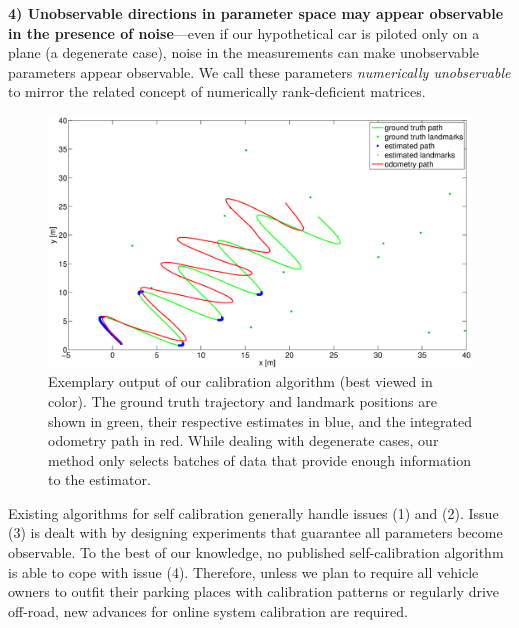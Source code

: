 {\bf 4) Unobservable directions in parameter space may appear observable in the
presence of noise}---even if our hypothetical car is piloted only on a plane (a
degenerate case), noise in the measurements can make unobservable parameters
appear observable. We call these parameters {\em numerically unobservable} to
mirror the related concept of numerically rank-deficient matrices.

\begin{figure}[t]
\centering
\includegraphics[width=\columnwidth]{fig/sin-path-result.eps}
\caption{Exemplary output of our calibration algorithm (best viewed in
  color). The ground truth trajectory and landmark positions are shown in green,
  their respective estimates in blue, and the integrated odometry path in red.
  While dealing with degenerate cases, our method only selects batches of data
  that provide enough information to the estimator.\vspace{-4.5pt}}
\label{fig:calib_demo}
\end{figure}

Existing algorithms for self calibration generally handle issues (1) and (2).
Issue (3) is dealt with by designing experiments that guarantee all parameters
become observable. To the best of our knowledge, no published self-calibration
algorithm is able to cope with issue (4). Therefore, unless we plan to require
all vehicle owners to outfit their parking places with calibration patterns or
regularly drive off-road, new advances for online system calibration are
required.

